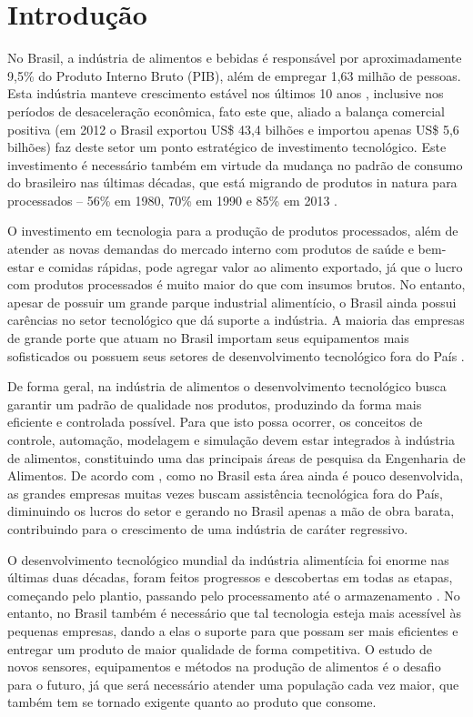 \chapter{Introdução}\label{introducao}
\pagestyle{fancyplain}
No Brasil, a indústria de alimentos e bebidas é responsável por aproximadamente 9,5\% do Produto Interno Bruto (PIB), além de empregar 1,63 milhão de pessoas. Esta indústria manteve crescimento estável nos últimos 10 anos \citep{gov-ibge}, inclusive nos períodos de desaceleração econômica, fato este que, aliado a balança comercial positiva (em 2012 o Brasil exportou US\$ 43,4 bilhões e importou apenas US\$ 5,6 bilhões) faz deste setor um ponto estratégico de investimento tecnológico. Este investimento é necessário também em virtude da mudança no padrão de consumo do brasileiro nas últimas décadas, que está migrando de produtos in natura para processados – 56\% em 1980, 70\% em 1990 e 85\% em 2013 \citep{abia}.

O investimento em tecnologia para a produção de produtos processados, além de atender as novas demandas do mercado interno com produtos de saúde e bem-estar e comidas rápidas, pode agregar valor ao alimento exportado, já que o lucro com produtos processados é muito maior do que com insumos brutos. No entanto, apesar de possuir um grande parque industrial alimentício, o Brasil ainda possui carências no setor tecnológico que dá suporte a indústria. A maioria das empresas de grande porte que atuam no Brasil importam seus equipamentos mais sofisticados ou possuem seus setores de desenvolvimento tecnológico fora do País \citep{obstaculos}.

De forma geral, na indústria de alimentos o desenvolvimento tecnológico busca garantir um padrão de qualidade nos produtos, produzindo da forma mais eficiente e controlada possível. Para que isto possa ocorrer, os conceitos de controle, automação, modelagem e simulação devem estar integrados à indústria de alimentos, constituindo uma das principais áreas de pesquisa da Engenharia de Alimentos. De acordo com \citet{joao_da_silva}, como no Brasil esta área ainda é pouco desenvolvida, as grandes empresas muitas vezes buscam assistência tecnológica fora do País, diminuindo os lucros do setor e gerando no Brasil apenas a mão de obra barata, contribuindo para o crescimento de uma indústria de caráter regressivo.

O desenvolvimento tecnológico mundial da indústria alimentícia foi enorme nas últimas duas décadas, foram feitos progressos e descobertas em todas as etapas, começando pelo plantio, passando pelo processamento até o armazenamento \citep{challenges}. No entanto, no Brasil também é necessário que tal tecnologia esteja mais acessível às pequenas empresas, dando a elas o suporte para que possam ser mais eficientes e entregar um produto de maior qualidade de forma competitiva. O estudo de novos sensores, equipamentos e métodos na produção de alimentos é o desafio para o futuro, já que será necessário atender uma população cada vez maior, que também tem se tornado exigente quanto ao produto que consome.


